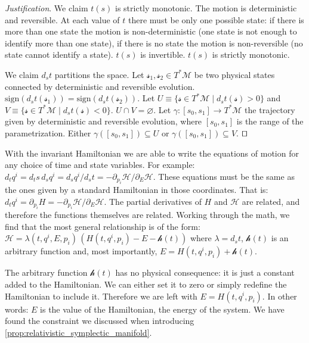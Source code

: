 \documentclass[smallextended]{svjour3}
\numberwithin{equation}{section}
\newenvironment{justification}{\emph{Justification}.}{\hfill\(\qed\)}
\theoremstyle{definition}
\newenvironment{justification}{\emph{Justification}.}{\qed}
\begin{document}
\begin{justification}
	We claim $t(s)$ is strictly monotonic. The motion is deterministic and reversible. At each value of $t$ there must be only one possible state: if there is more than one state the motion is non-deterministic (one state is not enough to identify more than one state), if there is no state the motion is non-reversible (no state cannot identify a state). $t(s)$ is invertible. $t(s)$ is strictly monotonic.
	
	We claim $d_{s}t$ partitions the space. Let $\mathcal{s}_1, \mathcal{s}_2 \in T^*\mathcal{M}$ be two physical states connected by deterministic and reversible evolution. $\mathrm{sign}(d_{s}t(\mathcal{s}_1)) = \mathrm{sign}(d_{s}t(\mathcal{s}_2))$. Let $U \equiv \{\mathcal{s} \in T^*\mathcal{M} \; | \; d_{s}t(\mathcal{s}) > 0 \}$ and $V \equiv \{\mathcal{s} \in T^*\mathcal{M} \; | \; d_{s}t(\mathcal{s}) < 0 \}$. $U \cap V = \varnothing$. Let $\gamma : [s_0, s_1] \rightarrow T^*\mathcal{M}$ the trajectory given by deterministic and reversible evolution, where $[s_0, s_1]$ is the range of the parametrization. Either $\gamma([s_0, s_1]) \subseteq U$ or $\gamma([s_0, s_1]) \subseteq V$.
\end{justification}

With the invariant Hamiltonian we are able to write the equations of motion for any choice of time and state variables. For example: $d_t q^i = d_t s \, d_s q^i = d_s q^i / d_s t = - \partial_{p_i} \mathcal{H} / \partial_{E} \mathcal{H}$. These equations must be the same as the ones given by a standard Hamiltonian in those coordinates. That is: $d_t q^i = \partial_{p_i} H = - \partial_{p_i} \mathcal{H} / \partial_{E} \mathcal{H}$. The partial derivatives of $H$ and $\mathcal{H}$ are related, and therefore the functions themselves are related. Working through the math, we find that the most general relationship is of the form: $\mathcal{H} = \lambda(t,q^i,E,p_i) \, (H(t,q^i,p_i) - E - \mathcal{h}(t))$ where $\lambda = d_s t$, $\mathcal{h}(t)$ is an arbitrary function and, most importantly, $E = H(t,q^i,p_i) + \mathcal{h}(t)$.

The arbitrary function $\mathcal{h}(t)$ has no physical consequence: it is just a constant added to the Hamiltonian. We can either set it to zero or simply redefine the Hamiltonian to include it. Therefore we are left with $E = H(t,q^i,p_i)$. In other words: $E$ is the value of the Hamiltonian, the energy of the system. We have found the constraint we discussed when introducing \ref{prop:relativistic_symplectic_manifold}.
\end{document}
